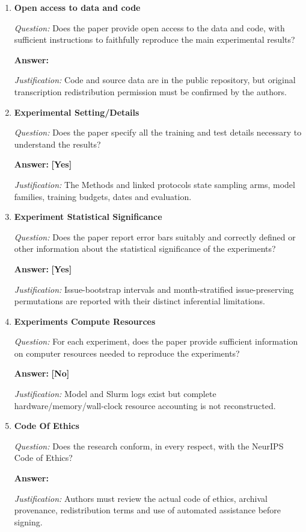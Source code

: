 \begin{enumerate}
\item \textbf{Open access to data and code}\par\noindent\textit{Question:} Does the paper provide open access to the data and code, with sufficient instructions to faithfully reproduce the main experimental results?\par\noindent\textbf{Answer:} \answerTODO{}\par\noindent\textit{Justification:} Code and source data are in the public repository, but original transcription redistribution permission must be confirmed by the authors.\par

\item \textbf{Experimental Setting/Details}\par\noindent\textit{Question:} Does the paper specify all the training and test details necessary to understand the results?\par\noindent\textbf{Answer:} \textbf{[Yes]}\par\noindent\textit{Justification:} The Methods and linked protocols state sampling arms, model families, training budgets, dates and evaluation.\par

\item \textbf{Experiment Statistical Significance}\par\noindent\textit{Question:} Does the paper report error bars suitably and correctly defined or other information about the statistical significance of the experiments?\par\noindent\textbf{Answer:} \textbf{[Yes]}\par\noindent\textit{Justification:} Issue-bootstrap intervals and month-stratified issue-preserving permutations are reported with their distinct inferential limitations.\par

\item \textbf{Experiments Compute Resources}\par\noindent\textit{Question:} For each experiment, does the paper provide sufficient information on computer resources needed to reproduce the experiments?\par\noindent\textbf{Answer:} \textbf{[No]}\par\noindent\textit{Justification:} Model and Slurm logs exist but complete hardware/memory/wall-clock resource accounting is not reconstructed.\par

\item \textbf{Code Of Ethics}\par\noindent\textit{Question:} Does the research conform, in every respect, with the NeurIPS Code of Ethics?\par\noindent\textbf{Answer:} \answerTODO{}\par\noindent\textit{Justification:} Authors must review the actual code of ethics, archival provenance, redistribution terms and use of automated assistance before signing.\par


\end{enumerate}
